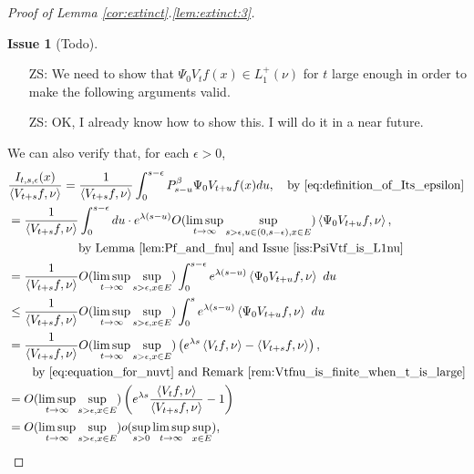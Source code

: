 \documentclass[12pt,a4paper]{amsart}
\numberwithin{equation}{section}
\theoremstyle{plain}
\theoremstyle{definition}
\newtheorem{iss}{Issue}
\begin{document}
\begin{proof}[Proof of Lemma \ref{cor:extinct}.\eqref{lem:extinct:3}]
\begin{iss}[Todo]~
\label{iss:PsiVtf_is_L1nu}
  \begin{itemize}
  \item[ZS:]
We need to show that $\Psi_0 V_tf(x) \in L_1^+(\nu)$ for $t$ large enough in order to make the following arguments valid.
\item[ZS:]
OK, I already know how to show this. I will do it in a near future. 
  \end{itemize}
\end{iss}
We can also verify that, for each $\epsilon > 0$,
\begin{align}
&\frac{I_{t,s,\epsilon}(x)}{\left\langle V_{t+s}f,\nu \right\rangle} 
= \frac{1}{\left\langle V_{t+s}f,\nu \right\rangle }  \int_0^{s-\epsilon} P_{s-u}^\beta \Psi_0 V_{t+u}f(x) du,\quad\text{by~\eqref{eq:definition_of_Its_epsilon}} 
\\& \begin{multlined}
= \frac{1}{\left\langle V_{t+s}f,\nu \right\rangle}  \int_0^{s-\epsilon} du \cdot e^{\lambda (s- u)} O(\limsup_{t\to \infty}\sup_{s > \epsilon, u\in (0, s-\epsilon), x\in E}) \left\langle \Psi_0 V_{t+u}f,\nu \right\rangle ,
\\\quad\text{by~Lemma \ref{lem:Pf_and_fnu} and Issue \ref{iss:PsiVtf_is_L1nu}} 
\end{multlined}
\\& = \frac{1}{\left\langle V_{t+s}f,\nu \right\rangle} O(\limsup_{t\to \infty}\sup_{s > \epsilon, x\in E}) \int_0^{s-\epsilon} e^{\lambda (s- u)}  \left\langle \Psi_0 V_{t+u}f,\nu \right\rangle ~du
\\& \leq \frac{1}{\left\langle V_{t+s}f,\nu \right\rangle} O(\limsup_{t\to \infty}\sup_{s > \epsilon, x\in E}) \int_0^{s} e^{\lambda (s- u)}  \left\langle \Psi_0 V_{t+u}f,\nu \right\rangle ~ du 
\\& \begin{multlined}
= \frac{1}{\left\langle V_{t+s}f,\nu \right\rangle} O(\limsup_{t\to \infty}\sup_{s > \epsilon, x\in E}) \left( e^{\lambda s} \left\langle V_tf,\nu \right\rangle - \left\langle V_{t+s}f,\nu \right\rangle \right),\\\quad\text{by~\eqref{eq:equation_for_nuvt} and Remark \ref{rem:Vtfnu_is_finite_when_t_is_large}}
\end{multlined}
\\& =O(\limsup_{t\to \infty}\sup_{s > \epsilon, x\in E}) \left( e^{\lambda s}\frac{ \left\langle V_tf,\nu \right\rangle }{\left \langle V_{t+s}f,\nu \right\rangle}- 1 \right) 
  \\& = O(\limsup_{t\to \infty}\sup_{s > \epsilon,x\in E}) o(\sup_{s>0}\limsup_{t\to \infty} \sup_{x\in E}),

\end{align}
\end{proof}
\end{document}
